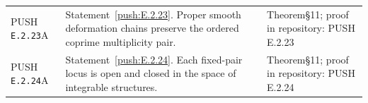 \begin{longtable}{@{}L{.18\linewidth}L{.48\linewidth}L{.29\linewidth}@{}}
PUSH \nolinkurl{E.2.23}\newline A & Statement~\ref{push:E.2.23}. Proper smooth deformation chains preserve the ordered coprime multiplicity pair.\newline {} & Theorem\newline §11; proof in repository:\allowbreak{} PUSH E.2.23\\
PUSH \nolinkurl{E.2.24}\newline A & Statement~\ref{push:E.2.24}. Each fixed-pair locus is open and closed in the space of integrable structures.\newline {} & Theorem\newline §11; proof in repository:\allowbreak{} PUSH E.2.24\\
\bottomrule\end{longtable}\endgroup
